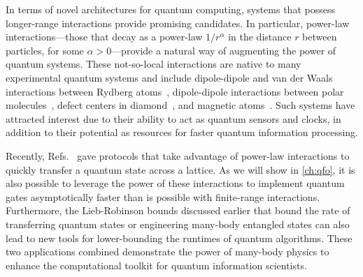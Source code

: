 In terms of novel architectures for quantum computing, systems that possess longer-range interactions provide promising candidates.
In particular, power-law interactions---those that decay as a power-law $1/r^\alpha$ in the distance  $r$ between particles, for some $\alpha > 0$---provide a natural way of augmenting the power of quantum systems.
These not-so-local interactions are native to many experimental quantum systems and include dipole-dipole and van der Waals interactions between Rydberg atoms~\cite{Saffman2010,Weimer2012}, dipole-dipole interactions between polar molecules~\cite{Yan2013}, defect centers in diamond~\cite{Yao2012,Weimer2012}, and magnetic atoms~\cite{Fraxanet2022}.
Such systems have attracted interest due to their ability to act as quantum sensors \cite{Foss-Feig15} and clocks, in addition to their potential as resources for faster quantum information processing.

Recently, Refs.~\cite{kuwaharaStrictlyLinearLight2020,Eldredge2017,Guo2020,Tran2021a} gave protocols that take advantage of power-law interactions to quickly transfer a quantum state across a lattice.
As we will show in \cref{ch:qfo}, it is also possible to leverage the power of these interactions to implement quantum gates asymptotically faster than is possible with finite-range interactions.
Furthermore, the Lieb-Robinson bounds discussed earlier that bound the rate of transferring quantum states or engineering many-body entangled states can also lead to new tools for lower-bounding the runtimes of quantum algorithms.
These two applications combined demonstrate the power of many-body physics to enhance the computational toolkit for quantum information scientists.


